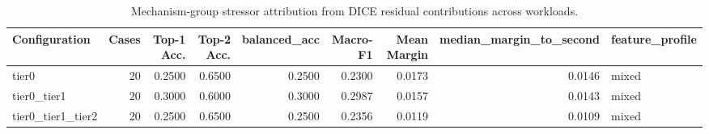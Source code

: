 \begin{table}[t]
\centering
\caption{Mechanism-group stressor attribution from DICE residual contributions across workloads.}
\label{tab:dice_stressor_diagnosis}
\footnotesize
\begin{tabular}{lrrrrrrrl}
\toprule
Configuration & Cases & Top-1 Acc. & Top-2 Acc. & balanced_acc & Macro-F1 & Mean Margin & median_margin_to_second & feature_profile \\
\midrule
tier0 & 20 & 0.2500 & 0.6500 & 0.2500 & 0.2300 & 0.0173 & 0.0146 & mixed \\
tier0_tier1 & 20 & 0.3000 & 0.6000 & 0.3000 & 0.2987 & 0.0157 & 0.0143 & mixed \\
tier0_tier1_tier2 & 20 & 0.2500 & 0.6500 & 0.2500 & 0.2356 & 0.0119 & 0.0109 & mixed \\
\bottomrule
\end{tabular}

\end{table}
